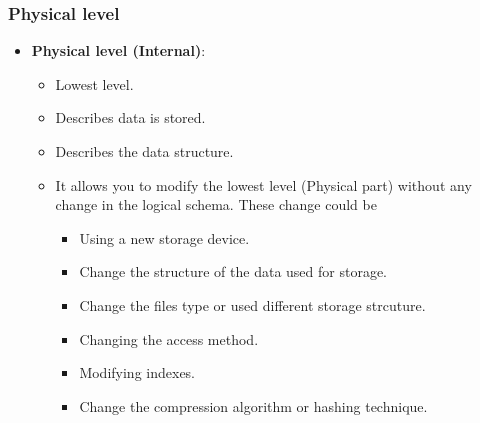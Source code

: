 \begin{frame}
	\frametitle{Physical level}
	\begin{itemize}[<+->]
		\item \textbf{Physical level (Internal)}: 
		\begin{itemize}[<+->]
			\item Lowest level.
			\item Describes \textbf{\underline{}} data is stored.
			\item Describes the data structure.
			\item It allows you to modify the lowest level (Physical part) without any change in the logical schema. These change could be
				\begin{itemize}[<+->]
				\item Using a new storage device.
				\item Change the structure of the data used for storage.
				\item Change the files type or used different storage strcuture.
				\item Changing the access method.
				\item Modifying indexes.
				\item Change the compression algorithm or hashing technique.
			\end{itemize}									
		\end{itemize}		
	\end{itemize}	
\end{frame}

